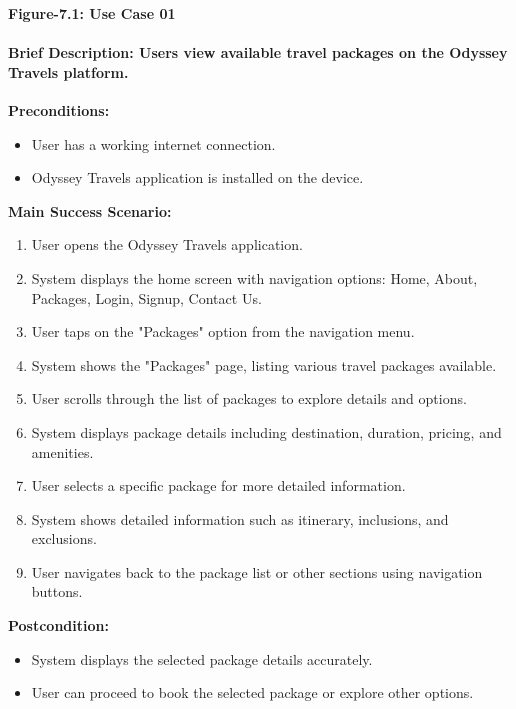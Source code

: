 \documentclass{scrreprt}
\begin{document}
\begin{center}
    \parbox{0.8\textwidth}{ 
        \centering
        \textbf{Figure-7.1: Use Case 01}
    }
\end{center}

\paragraph {\textnormal{Brief Description: 
Users view available travel packages on the Odyssey Travels platform.}}

\textbf{Preconditions:}
\begin{itemize}
    \item User has a working internet connection.
    \item Odyssey Travels application is installed on the device.
\end{itemize}

\textbf{Main Success Scenario:}
\begin{enumerate}
    \item User opens the Odyssey Travels application.
    \item System displays the home screen with navigation options: Home, About, Packages, Login, Signup, Contact Us.
    \item User taps on the "Packages" option from the navigation menu.
    \item System shows the "Packages" page, listing various travel packages available.
    \item User scrolls through the list of packages to explore details and options.
    \item System displays package details including destination, duration, pricing, and amenities.
    \item User selects a specific package for more detailed information.
    \item System shows detailed information such as itinerary, inclusions, and exclusions.
    \item User navigates back to the package list or other sections using navigation buttons.
\end{enumerate}

\textbf{Postcondition:}
\begin{itemize}
    \item System displays the selected package details accurately.
    \item User can proceed to book the selected package or explore other options.
\end{itemize}
\end{document}
